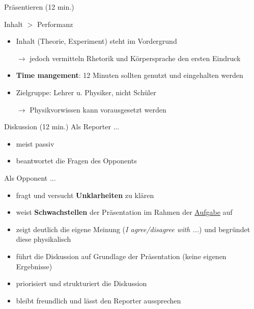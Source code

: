 \documentclass[9pt]{beamer}
\begin{document}
\begin{frame}{Präsentieren (12 min.)}
\begin{center}
{\huge Inhalt } $>$ {\tiny Performanz }
\end{center}
\vfill
\begin{itemize}
  \item Inhalt (Theorie, Experiment) steht im Vordergrund
  \item[$\rightarrow$]{\footnotesize jedoch vermitteln Rhetorik und Körpersprache den ersten Eindruck}
  \item \textbf{Time mangement}: 12 Minuten sollten genutzt und eingehalten werden
  \item Zielgruppe: Lehrer u. Physiker, nicht Schüler
  \item[$\rightarrow$] Physikvorwissen kann vorausgesetzt werden 
\end{itemize}
\end{frame}

\begin{frame}{Diskussion (12 min.)}
Als Reporter ...
\begin{itemize}
\item meist passiv
\item beantwortet die Fragen des Opponents
\end{itemize}
\pause
\vfill
Als Opponent ...
\begin{itemize}
\item fragt und versucht \textbf{Unklarheiten} zu klären 
\item weist \textbf{Schwachstellen} der Präsentation im Rahmen der \underline{Aufgabe} auf
\item zeigt deutlich die eigene Meinung (\emph{I agree/disagree with ...}) und begründet diese physikalisch
\item führt die Diskussion auf Grundlage der Präsentation (keine eigenen Ergebnisse)
\item priorisiert und strukturiert die Diskussion
\item bleibt freundlich und lässt den Reporter aussprechen
\end{itemize}
\end{frame}
\end{document}

